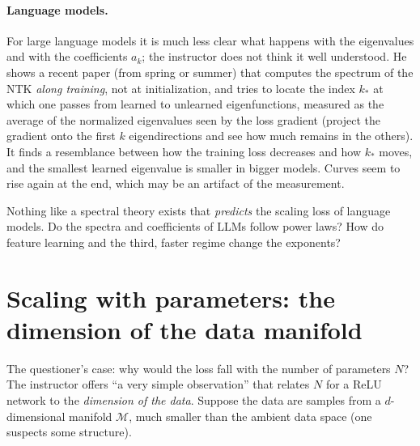\paragraph{Language models.}
For large language models it is much less clear what happens with the eigenvalues and with the coefficients $a_k$; the instructor does not think it well understood. He shows a recent paper (from spring or summer)\flag{} that computes the spectrum of the NTK \emph{along training}, not at initialization, and tries to locate the index $k_*$ at which one passes from learned to unlearned eigenfunctions,
measured as the average of the normalized eigenvalues seen by the loss gradient (project the gradient onto the first $k$ eigendirections and see how much remains in the others). It finds a resemblance between how the training loss decreases and how $k_*$ moves, and the smallest learned eigenvalue is smaller in bigger models. Curves seem to rise again at the end, which may be an artifact of the measurement.
\begin{openq}
Nothing like a spectral theory exists that \emph{predicts} the scaling loss of language models. Do the spectra and coefficients of LLMs follow power laws? How do feature learning and the third, faster regime change the exponents?
\end{openq}

\section{Scaling with parameters: the dimension of the data manifold}\label{sec:L3-params}
The questioner's case: why would the loss fall with the number of parameters $N$? The instructor offers ``a very simple observation'' that relates $N$ for a ReLU network to the \emph{dimension of the data}. Suppose the data are samples from a $d$-dimensional manifold $\mathcal M$, much smaller than the ambient data space (one suspects some structure).

